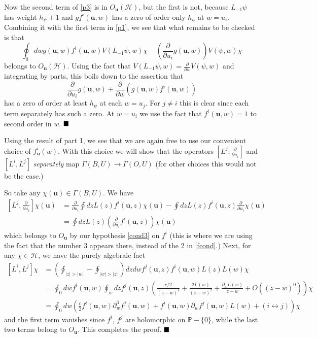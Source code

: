 \documentclass[a4paper,12pt]{article}
\newcommand{\uu}{{\mathbf u}}
\newcommand{\PP}{{\mathbb P}}
\newcommand{\F}{{\mathcal H}}
\newcommand{\abs}[1]{\lvert#1\rvert}
\newcommand{\done}{$\hfill \hfill \blacksquare$ \bigskip}
\newcommand{\dwrt}[1]{\frac{\partial}{\partial#1}}
\newcommand{\ci}{\oint}
\newcommand{\oproof}[1]{\noindent {\bf Proof#1.\ }}
\newcommand{\ti}[1]{\textit{#1}}
\begin{document}
Now the second term of \eqref{p3} is in $O_\uu(\F)$, but the first is not, because $L_{-1}\psi$ has weight $h_\psi+1$ and $gf^i(\uu,w)$
has a zero of order only $h_\psi$ at $w = u_i$.  
Combining it with the first term in \eqref{p1}, we see that what remains to be checked is that
\begin{equation} \label{p4}
\ci_0 dw  g(\uu,w) f^i(\uu,w) V(L_{-1} \psi, w) \chi - \left( \dwrt{u_i} g(\uu,w) \right) V(\psi,w) \chi
\end{equation}
belongs to $O_\uu(\F)$.  Using the fact that $V(L_{-1} \psi, w) = \dwrt{w} V(\psi, w)$ and integrating by parts, this boils
down to the assertion that
\begin{equation}
\dwrt{u_i} g(\uu,w) + \dwrt{w} \left(g(\uu,w) f^i(\uu,w) \right)
\end{equation}
has a zero of order at least 
$h_\psi$ at each $w = u_j$.  For $j \ne i$ this is clear since each term separately has such a zero.
At $w = u_i$ we use the fact that $f^i(\uu, w) = 1$ to second order in $w$. \done

\oproof{ of 2} Using the result of part 1, we see that we are again free
to use our convenient choice of $f^i_\uu(w)$.  With this choice we will show
that the operators $[L^j, \dwrt{u_i}]$ and $[L^i, L^j]$ \ti{separately} map $\Gamma(B,U) \to \Gamma(O,U)$ (for
other choices this would not be the case.)

So take any $\chi(\uu) \in \Gamma(B,U)$.  We have
\begin{equation}
\begin{split}
\left[L^j, \dwrt{u_i}\right] \chi(\uu) &= \dwrt{u_i} \ci dz L(z) f^i(\uu,z) \chi(\uu) - \ci dz L(z) f^i(\uu, z) \dwrt{u_i} \chi(\uu) \\
                            &= \ci dz L(z) \left(\dwrt{u_i} f^i(\uu,z)\right) \chi(\uu) 
\end{split}
\end{equation}
which belongs to $O_\uu$ by our hypothesis \eqref{cond3} on $f^i$ (this is
where we are using the fact that the number $3$ appears there, instead of the
$2$ in \eqref{fcond}.)  Next, for any $\chi \in \F$, we have the purely algebraic fact
\begin{equation}
\begin{split}
[L^i, L^j] \chi &= \left(\ci_{\abs{z}>\abs{w}} - \ci_{\abs{w}>\abs{z}}\right) dz dw f^j(\uu,z) f^i(\uu,w) L(z) L(w) \chi \\
	      	&= \ci_0 dw f^i(\uu, w) \ci_w dz f^j(\uu,z) \left( \frac{c/2}{(z-w)^4} + \frac{2L(w)}{(z-w)^2} + \frac{\partial_w L(w)}{z-w} + O((z-w)^0) \right) \chi \\
		&= \ci_0 dw \left( \frac{c}{2} f^i(\uu, w) \partial_w^3 f^j(\uu, w) + f^i(\uu,w) \partial_w f^j(\uu, w) L(w) + (i \leftrightarrow j) \right) \chi 
\end{split}
\end{equation}
and the first term vanishes since $f^i$, $f^j$ are holomorphic on $\PP - \{ 0 \}$, 
while the last two terms belong to $O_\uu$.  This completes the proof. \done
\end{document}
